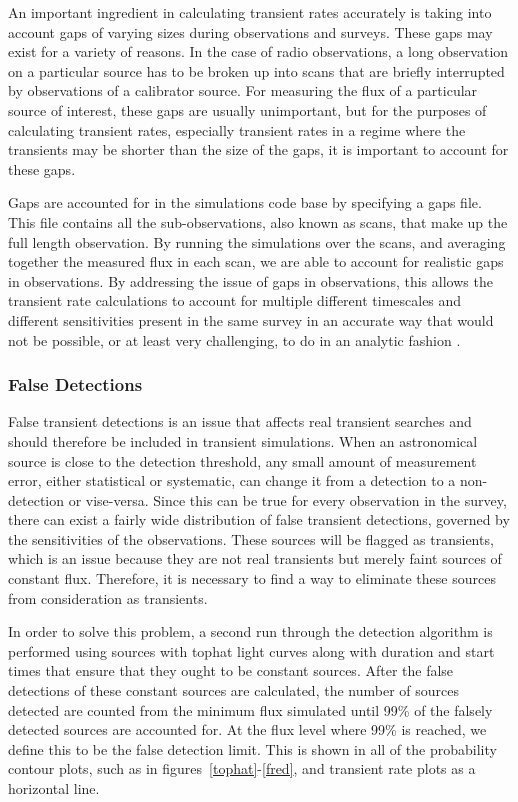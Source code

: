 \documentclass[12pt]{article}
\begin{document}
An important ingredient in calculating transient rates accurately is taking into account gaps of varying sizes during observations and surveys. These gaps may exist for a variety of reasons. In the case of radio observations, a long observation on a particular source has to be broken up into scans that are briefly interrupted by observations of a calibrator source. For measuring the flux of a particular source of interest, these gaps are usually unimportant, but for the purposes of calculating transient rates, especially transient rates in a regime where the transients may be shorter than the size of the gaps, it is important to account for these gaps. 

Gaps are accounted for in the simulations code base by specifying a gaps file. This file contains all the sub-observations, also known as scans, that make up the full length observation. By running the simulations over the scans, and averaging together the measured flux in each scan, we are able to account for realistic gaps in observations. By addressing the issue of gaps in observations, this allows the transient rate calculations to account for multiple different timescales and different sensitivities present in the same survey in an accurate way that would not be possible, or at least very challenging, to do in an analytic fashion \citep{2016MNRAS.459.3161C}.




\subsubsection{False Detections}
False transient detections is an issue that affects real transient searches and should therefore be included in transient simulations. When an astronomical source is close to the detection threshold, any small amount of measurement error, either statistical or systematic, can change it from a detection to a non-detection or vise-versa. Since this can be true for every observation in the survey, there can exist a fairly wide distribution of false transient detections, governed by the sensitivities of the observations. These sources will be flagged as transients, which is an issue because they are not real transients but merely faint sources of constant flux. Therefore, it is necessary to find a way to eliminate these sources from consideration as transients. 

In order to solve this problem, a second run through the detection algorithm is performed using sources with tophat light curves along with duration and start times that ensure that they ought to be constant sources. After the false detections of these constant sources are calculated, the number of sources detected are counted from the minimum flux simulated until 99\% of the falsely detected sources are accounted for. At the flux level where 99\% is reached, we define this to be the false detection limit. This is shown in all of the probability contour plots, such as in figures~\ref{tophat}-\ref{fred}, and transient rate plots as a horizontal line. 
\end{document}

